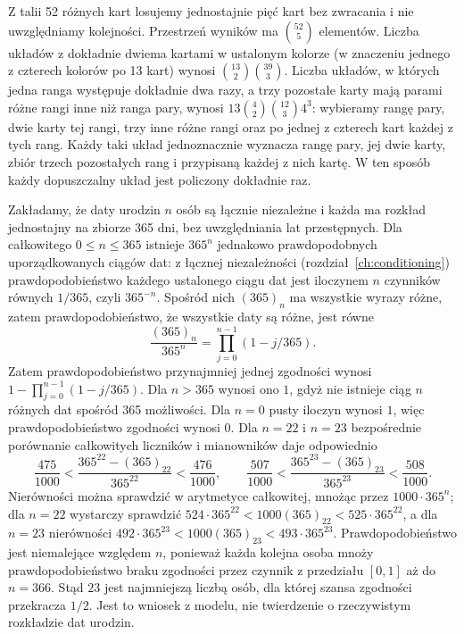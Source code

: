 \begin{przyklad}
Z talii 52 różnych kart losujemy jednostajnie pięć kart bez
zwracania i nie uwzględniamy kolejności. Przestrzeń wyników ma $\binom{52}5$ elementów.
Liczba układów z dokładnie dwiema kartami w ustalonym kolorze
(w znaczeniu jednego z czterech kolorów po 13 kart) wynosi
$\binom{13}2\binom{39}3$. Liczba układów, w których jedna ranga występuje dokładnie
dwa razy, a trzy pozostałe karty mają parami różne rangi
inne niż ranga pary, wynosi
$13\binom42\binom{12}3 4^3$: wybieramy rangę pary,
dwie karty tej rangi, trzy inne różne rangi oraz po jednej z czterech
kart każdej z tych rang. Każdy taki układ jednoznacznie wyznacza rangę pary,
jej dwie karty, zbiór trzech pozostałych rang i przypisaną
każdej z nich kartę. W ten sposób każdy dopuszczalny układ
jest policzony dokładnie raz.
\end{przyklad}

\begin{przyklad}
Zakładamy, że daty urodzin $n$ osób są łącznie niezależne
i każda ma rozkład jednostajny na zbiorze 365 dni, bez uwzględniania lat przestępnych. Dla całkowitego $0\leq n\leq365$ istnieje $365^n$
jednakowo prawdopodobnych uporządkowanych ciągów dat: z łącznej
niezależności (rozdział~\ref{ch:conditioning}) prawdopodobieństwo
każdego ustalonego ciągu dat jest iloczynem $n$ czynników
równych $1/365$, czyli $365^{-n}$.
Spośród nich $(365)_n$ ma wszystkie wyrazy różne, zatem
prawdopodobieństwo, że wszystkie daty są różne, jest równe
\[
\frac{(365)_n}{365^n}=\prod_{j=0}^{n-1}(1-j/365).
\] Zatem prawdopodobieństwo przynajmniej
jednej zgodności wynosi
$1-\prod_{j=0}^{n-1}(1-j/365)$.
Dla $n>365$ wynosi ono $1$, gdyż nie istnieje ciąg $n$ różnych
dat spośród 365 możliwości. Dla $n=0$ pusty iloczyn wynosi $1$,
więc prawdopodobieństwo zgodności wynosi $0$.
Dla $n=22$ i $n=23$ bezpośrednie porównanie całkowitych
liczników i mianowników daje odpowiednio
\[
\frac{475}{1000}
<\frac{365^{22}-(365)_{22}}{365^{22}}
<\frac{476}{1000},\qquad
\frac{507}{1000}
<\frac{365^{23}-(365)_{23}}{365^{23}}
<\frac{508}{1000}.
\]
Nierówności można sprawdzić w arytmetyce całkowitej, mnożąc
przez $1000\cdot365^n$; dla $n=22$ wystarczy sprawdzić
$524\cdot365^{22}<1000(365)_{22}<525\cdot365^{22}$,
a dla $n=23$ nierówności
$492\cdot365^{23}<1000(365)_{23}<493\cdot365^{23}$.
Prawdopodobieństwo jest niemalejące względem $n$, ponieważ
każda kolejna osoba mnoży prawdopodobieństwo braku zgodności
przez czynnik z przedziału $[0,1]$ aż do $n=366$.
Stąd $23$ jest najmniejszą liczbą osób, dla której szansa
zgodności przekracza $1/2$. Jest to wniosek z modelu,
nie twierdzenie o rzeczywistym rozkładzie dat urodzin.
\end{przyklad}


